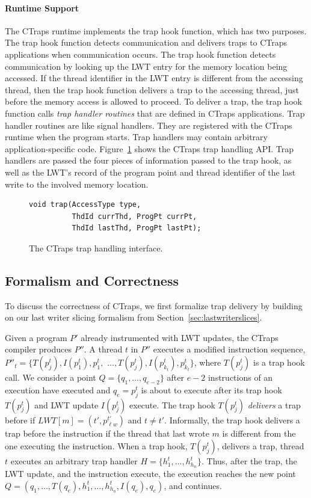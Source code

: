 \documentclass[preprint,9pt]{sigplanconf}
\newcommand{\ctraps}{CTraps\xspace}
\newcommand{\lwt}{LWT\xspace}
\begin{document}
\paragraph{Runtime Support}
The \ctraps runtime implements the trap hook function,  which has two purposes.
The trap hook function detects communication and delivers traps to \ctraps
applications when communication occurs.  The trap hook function detects
communication by looking up the \lwt entry for the memory location being
accessed.  If the thread identifier in the \lwt entry is different from the
accessing thread, then the trap hook function delivers a trap to the accessing
thread, just before the memory access is allowed to proceed.  To deliver a
trap, the trap hook function calls {\em trap handler routines} that are defined
in \ctraps applications.  Trap handler routines are like signal handlers.  They
are registered with the \ctraps runtime when the program starts.  Trap handlers
may contain arbitrary application-specific code.  Figure~\ref{fig:hookapi}
shows the \ctraps trap handling API.  Trap handlers are passed the four pieces
of information passed to the trap hook, as well as the \lwt's record of the
program point and thread identifier of the last write to the involved memory
location.

\begin{figure}[htb]
\centering
\begin{verbatim}
void trap(AccessType type, 
          ThdId currThd, ProgPt currPt,
          ThdId lastThd, ProgPt lastPt);
\end{verbatim}
\caption{\label{fig:hookapi}The \ctraps trap handling interface.}
\end{figure}

\subsection{Formalism and Correctness}
\label{sec:ctsoundness}
To discuss the correctness of \ctraps, we first formalize trap delivery by
building on our last writer slicing formalism from
Section~\ref{sec:lastwriterslices}.  

Given a program $P'$ already instrumented with \lwt updates, the \ctraps
compiler produces $P''$. A thread $t$ in $P''$ executes a modified instruction
sequence, $P''_{t} = \{ T(p^{t}_{j}), I(p^{t}_{1}), p^{t}_{1},$ $\ldots,
T(p^{t}_{j}), I(p^{t}_{k_{t}}), p^{t}_{k_{t}} \}$, where $T(p^{t}_{j})$ is a
trap hook call.  We consider a point $Q = \{q_1, \ldots, q_{e-2}\}$ after $e-2$
instructions of an execution have executed and $q_{e} = p^{t}_{j}$ is about to
execute after its trap hook $T(p^{t}_{j})$ and \lwt update $I(p^{t}_{j})$
execute.  The trap hook $T(p^{t}_{j})$ {\em delivers} a trap before if $LWT[m]
= (t',p^{t'}_{\ell w})$ and $t \ne t'$.  Informally, the trap hook delivers a
trap before the instruction if the thread that last wrote $m$ is different from
the one executing the instruction.  When a trap hook, $T(p^{t}_{j})$, delivers
a trap, thread $t$ executes an arbitrary trap handler $H = \{h^{t}_{1}, \ldots,
h^{t}_{h_{n}}\}$.  Thus, after the trap, the \lwt update, and the instruction
execute, the execution reaches the new point $Q = (q_{1}, \ldots, T(q_{e}),
h^{t}_{1}, \ldots, h^{t}_{h_{n}}, I(q_{e}), q_{e})$, and continues.
\end{document}
